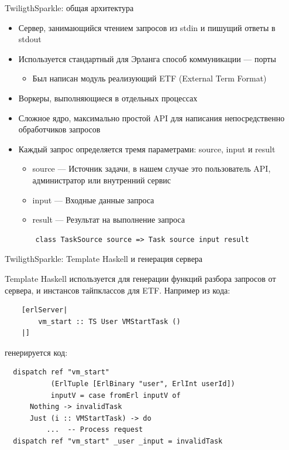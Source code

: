 \documentclass[10pt]{beamer}
\begin{document}
\begin{frame}[fragile]{TwiligthSparkle: общая архитектура}
\begin{itemize}
  \item<1-> Сервер, занимающийся чтением запросов из stdin и пишущий ответы
  в stdout
  \item<1-> Используется стандартный для Эрланга способ коммуникации — порты
  \begin{itemize}
    \item Был написан модуль реализующий ETF (External Term Format)
  \end{itemize}
  \item<2-> Воркеры, выполняющиеся в отдельных процессах
  \item<3-> Сложное ядро, максимально простой API для написания непосредственно
  обработчиков запросов
  \item<4-> Каждый запрос определяется тремя параметрами: source, input и result
  \begin{itemize}
    \item source — Источник задачи, в нашем случае это пользователь API,
    администратор или внутренний сервис
    \item input — Входные данные запроса
    \item result — Результат на выполнение запроса
  \end{itemize}
  \begin{verbatim}
    class TaskSource source => Task source input result
  \end{verbatim}
\end{itemize}
\end{frame}

\begin{frame}[fragile]{TwiligthSparkle: Template Haskell и генерация сервера}

  Template Haskell используется для генерации функций разбора запросов
  от сервера, и инстансов тайпклассов для ETF. Например из кода:

  \begin{verbatim}
    [erlServer|
        vm_start :: TS User VMStartTask ()
    |]
  \end{verbatim}

генерируется код:

  \begin{verbatim}
  dispatch ref "vm_start"
           (ErlTuple [ErlBinary "user", ErlInt userId])
           inputV = case fromErl inputV of
      Nothing -> invalidTask
      Just (i :: VMStartTask) -> do
          ...  -- Process request
  dispatch ref "vm_start" _user _input = invalidTask
\end{verbatim}
\end{frame}
\end{document}
